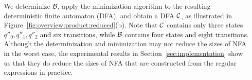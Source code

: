 We determinize $\mathcal{B}$, apply the minimization algorithm to the resulting deterministic finite automaton (DFA), and obtain a DFA $\mathcal{C}$, as illustrated in Figure~\ref{fig:overview:product:reduced}(b). 
Note that $\mathcal{C}$ contains only three states $q''_0, q''_1, q''_2$ and six transitions, while $\mathcal{B}$ contains four states and eight transitions. 
Although the determinization and minimization may not reduce the sizes of NFA in the worst case, the experimental results in Section~\ref{sec:implementation} show us that they do reduce the sizes of NFA that are constructed from the regular expressions in practice. 


